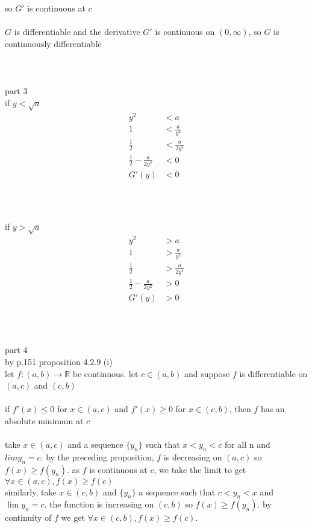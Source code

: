 \documentclass[12pt, border = 4pt, multi]{article} %
\begin{document}
so $G'$ is continuous at $c$\\
\\
$G$ is differentiable and the derivative $G'$ is continuous on $(0, \infty)$, so $G$ is continuously differentiable\\
\\
\\
\\
part 3\\
if $y < \sqrt{a}$
\begin{align*}
y ^ 2 &< a\\
1 &< \frac{a}{y ^ 2}\\
\frac{1}{2} &< \frac{a}{2y ^ 2}\\
\frac{1}{2} - \frac{a}{2y ^ 2} &< 0\\
G'(y) &< 0\\
\end{align*}
\\
\\
\\
if $y > \sqrt{a}$
\begin{align*}
y ^ 2 &> a\\
1 &> \frac{a}{y ^ 2}\\
\frac{1}{2} &> \frac{a}{2y ^ 2}\\
\frac{1}{2} - \frac{a}{2y ^ 2} &> 0\\
G'(y) &> 0\\
\end{align*}
\\
\\
\\
part 4\\
by p.151 proposition 4.2.9 (i)\\
let $f: (a, b) \rightarrow \mathbb{R}$ be continuous. let $c \in (a, b)$ and suppose $f$ is differentiable on $(a, c)$ and $(c, b)$\\
\\
if $f'(x) \leq 0$ for $x \in (a, c)$ and $f'(x) \geq 0$ for $x \in (c,b)$, then $f$ has an absolute minimum at $c$\\
\\
take $x \in (a, c)$ and a sequence
$\{y_n\}$ such that $x < y_n < c$ for all n and $lim y_n = c$. by the preceding proposition, $f$ is decreasing on
$(a, c)$ so $f(x) \geq f(y_n)$. as $f$ is continuous at $c$, we take the limit to get $\forall x \in (a, c), f(x) \geq f(c)$\\
similarly, take $x \in (c, b)$ and $\{y_n\}$ a sequence such that $c < y_n < x$ and $\lim y_n = c$. the function
is increasing on $(c, b)$ so $f(x) \geq f(y_n)$. by continuity of $f$ we get $ \forall x \in (c, b), f(x) \geq f(c)$.
\end{document}

